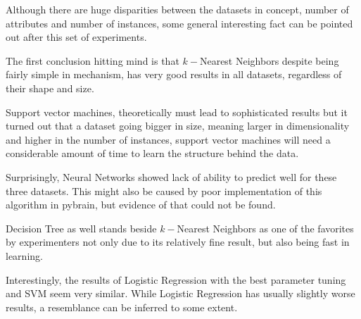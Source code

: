 Although there are huge disparities between the datasets in concept, number of
attributes and number of instances, some general interesting fact can be pointed
out after this set of experiments.

The first conclusion hitting mind is that $k-$Nearest Neighbors despite being
fairly simple in mechanism, has very good results in all datasets, regardless of
their shape and size.

Support vector machines, theoretically must lead to sophisticated results but it
turned out that a dataset going bigger in size, meaning larger in dimensionality
and higher in the number of instances, support vector machines will need a
considerable amount of time to learn the structure behind the data.

Surprisingly, Neural Networks showed lack of ability to predict well for these
three datasets. This might also be caused by poor implementation of
this algorithm in pybrain, but evidence of that could not be found.

Decision Tree as well stands beside $k-$Nearest Neighbors as one of the
favorites by experimenters not only due to its relatively fine result, but also
being fast in learning.

Interestingly, the results of Logistic Regression with the best parameter tuning and SVM seem very similar. While Logistic Regression has usually slightly worse results, a resemblance can be inferred to some extent.
